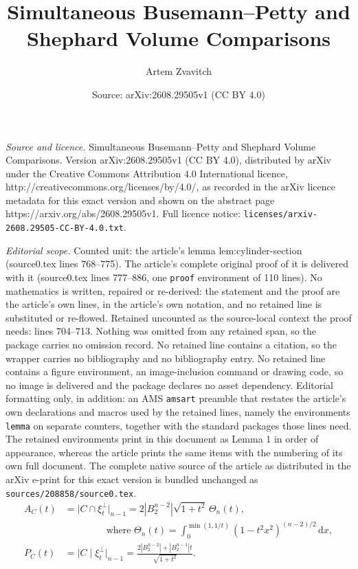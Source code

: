 \documentclass[10pt,a4paper]{amsart}
\title{Simultaneous Busemann--Petty and Shephard Volume Comparisons}
\author{Artem Zvavitch}
\date{Source: arXiv:2608.29505v1 (CC BY 4.0)}
\newcommand{\dd}{\,\mathrm{d}}
\begin{document}
\maketitle

\noindent\emph{Source and licence.} Simultaneous Busemann--Petty and Shephard Volume Comparisons. Version arXiv:2608.29505v1 (CC BY 4.0), distributed by arXiv under the Creative Commons Attribution 4.0 International licence, http://creativecommons.org/licenses/by/4.0/, as recorded in the arXiv licence metadata for this exact version and shown on the abstract page https://arxiv.org/abs/2608.29505v1. Full licence notice: \texttt{licenses/arxiv-2608.29505-CC-BY-4.0.txt}.\par\smallskip

\noindent\textit{Editorial scope.} Counted unit: the article's lemma lem:cylinder-section (source0.tex lines 768--775). The article's complete original proof of it is delivered with it (source0.tex lines 777--886, one \texttt{proof} environment of 110 lines). No mathematics is written, repaired or re-derived: the statement and the proof are the article's own lines, in the article's own notation, and no retained line is substituted or re-flowed.  Retained uncounted as the source-local context the proof needs: lines 704--713.  Nothing was omitted from any retained span, so the package carries no omission record.  No retained line contains a citation, so the wrapper carries no bibliography and no bibliography entry.  No retained line contains a figure environment, an image-inclusion command or drawing code, so no image is delivered and the package declares no asset dependency.  Editorial formatting only, in addition: an AMS \texttt{amsart} preamble that restates the article's own declarations and macros used by the retained lines, namely the environments \texttt{lemma} on separate counters, together with the standard packages those lines need.  The retained environments print in this document as Lemma 1 in order of appearance, whereas the article prints the same items with the numbering of its own full document.  The complete native source of the article as distributed in the arXiv e-print for this exact version is bundled unchanged as \texttt{sources/208858/source0.tex}.
\begin{align}
 A_C(t)&=\bigl|C\cap\xi_t^\perp\bigr|_{n-1}=2|B_2^{n-2}|\sqrt{1+t^2}\,\Theta_n(t),
 \label{eq:cylinder-section}\\
&\qquad\qquad\mbox{  where } \Theta_n(t)=\int_0^{\min(1,1/t)}
 (1-t^2x^2)^{(n-2)/2}\dd x,
 \label{eq:In}\\
 P_C(t)&=\bigl|C\mid\xi_t^\perp\bigr|_{n-1}=\frac{2|B_2^{n-2}|
                 +|B_2^{n-1}|t}{\sqrt{1+t^2}}.
 \label{eq:cylinder-projection}
\end{align}
\end{document}
